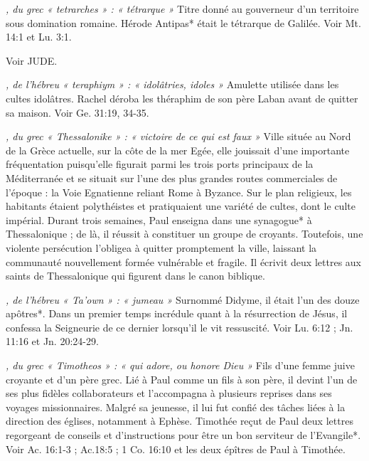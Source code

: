 \begin{multicols}{2}
\textit{, du grec « tetrarches » : « tétrarque »}\newline
Titre donné au gouverneur d'un territoire sous domination romaine. Hérode Antipas* était le tétrarque de Galilée. Voir Mt. 14:1 et Lu. 3:1.

\textit{}\newline
Voir JUDE.

\textit{, de l'hébreu « teraphiym » : « idolâtries, idoles »}\newline
Amulette utilisée dans les cultes idolâtres. Rachel déroba les théraphim de son père Laban avant de quitter sa maison. Voir Ge. 31:19, 34-35.

\textit{, du grec « Thessalonike » : « victoire de ce qui est faux »}\newline
Ville située au Nord de la Grèce actuelle, sur la côte de la mer Egée, elle jouissait d'une importante fréquentation puisqu'elle figurait parmi les trois ports principaux de la Méditerranée et se situait sur l'une des plus grandes routes commerciales de l'époque : la Voie Egnatienne reliant Rome à Byzance. Sur le plan religieux, les habitants étaient polythéistes et pratiquaient une variété de cultes, dont le culte impérial. Durant trois semaines, Paul enseigna dans une synagogue* à Thessalonique ; de là, il réussit à constituer un groupe de croyants. Toutefois, une violente persécution l'obligea à quitter promptement la ville, laissant la communauté nouvellement formée vulnérable et fragile. Il écrivit deux lettres aux saints de Thessalonique qui figurent dans le canon biblique.

\textit{, de l'hébreu « Ta'own » : « jumeau »}\newline
Surnommé Didyme, il était l'un des douze apôtres*. Dans un premier temps incrédule quant à la résurrection de Jésus, il confessa la Seigneurie de ce dernier lorsqu'il le vit ressuscité. Voir Lu. 6:12 ; Jn. 11:16 et Jn. 20:24-29.

\textit{, du grec « Timotheos » : « qui adore, ou honore Dieu »}\newline
Fils d'une femme juive croyante et d'un père grec. Lié à Paul comme un fils à son père, il devint l'un de ses plus fidèles collaborateurs et l'accompagna à plusieurs reprises dans ses voyages missionnaires. Malgré sa jeunesse, il lui fut confié des tâches liées à la direction des églises, notamment à Ephèse. Timothée reçut de Paul deux lettres regorgeant de conseils et d'instructions pour être un bon serviteur de l'Evangile*. Voir Ac. 16:1-3 ; Ac.18:5 ; 1 Co. 16:10 et les deux épîtres de Paul à Timothée.


\end{multicols}
